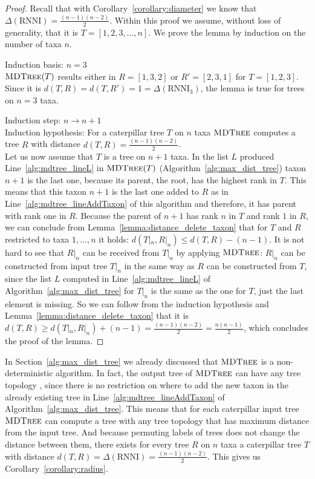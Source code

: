 \documentclass{amsart}
\newcommand{\rnni}{\mathrm{RNNI}}
\newcommand{\mdtree}{\textsc{MDTree}}
\begin{document}
\begin{proof}
    Recall that with Corollary~\ref{corollary:diameter} we know that $\Delta(\rnni) = \frac{(n-1)(n-2)}{2}$.
    Within this proof we assume, without loss of generality, that it is $T = [1,2,3,\ldots,n]$.
    We prove the lemma by induction on the number of taxa $n$.

    Induction basis: $n = 3$\\
    $\mdtree(T)$ results either in $R =[1,3,2]$ or $R'= [2,3,1]$ for $T = [1,2,3]$.
    Since it is $d(T,R) = d(T,R') = 1 = \Delta(\rnni_3)$, the lemma is true for trees on $n=3$ taxa.

    Induction step: $n \to n+1$\\
    Induction hypothesis: For a caterpillar tree $T$ on $n$ taxa $\mdtree$ computes a tree $R$ with distance $d(T,R) = \frac{(n-1)(n-2)}{2}$.\\
    Let us now  assume that $T$ is a tree on $n+1$ taxa.
    In the list $L$ produced Line~\ref{alg:mdtree_lineL} in $\mdtree(T)$ (Algorithm~\ref{alg:max_dist_tree}) taxon $n+1$ is the last one, because its parent, the root, has the highest rank in $T$.
    This means that this taxon $n+1$ is the last one added to $R$ as in Line~\ref{alg:mdtree_lineAddTaxon} of this algorithm and therefore, it has parent with rank one in $R$.
    Because the parent of $n+1$ has rank $n$ in $T$ and rank $1$ in $R$, we can conclude from Lemma~\ref{lemma:distance_delete_taxon} that for $T$ and $R$ restricted to taxa $1,\ldots,n$ it holds: $d(T|_n,R|_n) \leq d(T,R) - (n-1)$.
    It is not hard to see that $R|_n$ can be received from $T|_n$ by applying $\mdtree$:
    $R|_n$ can be constructed from input tree $T|_n$ in the same way as $R$ can be constructed from $T$, since the list $L$ computed in Line~\ref{alg:mdtree_lineL} of Algorithm~\ref{alg:max_dist_tree} for $T|_n$ is the same as the one for $T$, just the last element is missing.
    So we can follow from the induction hypothesis and Lemma~\ref{lemma:distance_delete_taxon} that it is $d(T,R) \geq d(T|_n,R|_n) + (n-1) = \frac{(n-1)(n-2)}{2} = \frac{n(n-1)}{2}$, which concludes the proof of the lemma.
\end{proof}

In Section~\ref{alg:max_dist_tree} we already discussed that $\mdtree$ is a non-deterministic algorithm.
In fact, the output tree of $\mdtree$ can have any tree topology
, since there is no restriction on where to add the new taxon in the already existing tree in Line~\ref{alg:mdtree_lineAddTaxon} of Algorithm~\ref{alg:max_dist_tree}.
This means that for each caterpillar input tree $\mdtree$ can compute a tree with any tree topology that has maximum distance from the input tree.
And because permuting labels of trees does not change the distance between them, there exists for every tree $R$ on $n$ taxa a caterpillar tree $T$ with distance $d(T,R) = \Delta(\rnni) = \frac{(n-1)(n-2)}{2}$.
This gives us Corollary~\ref{corollary:radius}.
\end{document}
